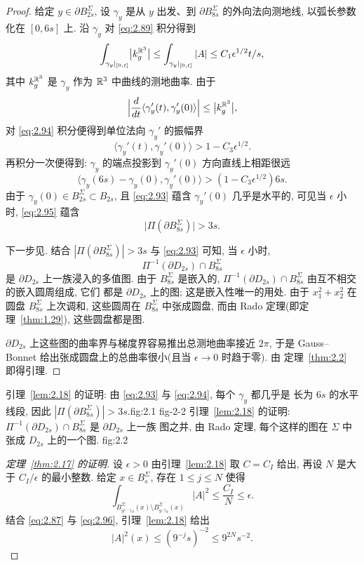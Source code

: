 \begin{proof}
给定 $y\in\partial B_{2s}^{\Sigma}$, 设 $\gamma_y$ 是从 $y$ 出发、到
$\partial B_{8s}^{\Sigma}$ 的外向法向测地线, 以弧长参数化在 $[0,6s]$ 上.
沿 $\gamma_y$ 对 \eqref{eq:2.89} 积分得到
\begin{equation}
\int_{\gamma_y|_{[0,t]}}\bigl|k_g^{\mathbb{R}^3}\bigr|
 \leq\int_{\gamma_y|_{[0,t]}}|A|
 \leq C_1\epsilon^{1/2}t/s,
\label{eq:2.94}
\end{equation}
其中 $k_g^{\mathbb{R}^3}$ 是 $\gamma_y$ 作为 $\mathbb{R}^3$ 中曲线的测地曲率. 由于
\[
\Bigl|\frac{d}{dt}\langle\gamma_y'(t),\gamma_y'(0)\rangle\Bigr|
 \leq\bigl|k_g^{\mathbb{R}^3}\bigr|,
\]
对 \eqref{eq:2.94} 积分便得到单位法向 $\gamma_y'$ 的振幅界
\[
\langle\gamma_y'(t),\gamma_y'(0)\rangle>1-C_3\epsilon^{1/2}.
\]
再积分一次便得到: $\gamma_y$ 的端点投影到 $\gamma_y'(0)$ 方向直线上相距很远
\begin{equation}
\langle\gamma_y(6s)-\gamma_y(0),\gamma_y'(0)\rangle
 >(1-C_3\epsilon^{1/2})6s.
\label{eq:2.95}
\end{equation}
由于 $\gamma_y(0)\in B_{2s}^{\Sigma}\subset B_{2s}$, 且 \eqref{eq:2.93} 蕴含
$\gamma_y'(0)$ 几乎是水平的, 可见当 $\epsilon$ 小时, \eqref{eq:2.95} 蕴含
\[
\bigl|\Pi(\partial B_{8s}^{\Sigma})\bigr|>3s.
\]

下一步见. 结合 $|\Pi(\partial B_{8s}^{\Sigma})|>3s$ 与
\eqref{eq:2.93} 可知, 当 $\epsilon$ 小时,
\[
\Pi^{-1}(\partial D_{2s})\cap B_{8s}^{\Sigma}
\]
是 $\partial D_{2s}$ 上一族浸入的多值图. 由于 $B_{8s}^{\Sigma}$ 是嵌入的,
$\Pi^{-1}(\partial D_{2s})\cap B_{8s}^{\Sigma}$ 由互不相交的嵌入圆周组成, 它们
都是 $\partial D_{2s}$ 上的图; 这是嵌入性唯一的用处. 由于 $x_1^{2}+x_2^{2}$ 在
圆盘 $B_{8s}^{\Sigma}$ 上次调和, 这些圆周在 $B_{8s}^{\Sigma}$ 中张成圆盘, 而由
Rado 定理(即定理~\ref{thm:1.29}), 这些圆盘都是图.

$\partial D_{2s}$ 上这些图的曲率界与梯度界容易推出总测地曲率接近 $2\pi$, 于是
Gauss--Bonnet 给出张成圆盘上的总曲率很小(且当 $\epsilon\to0$ 时趋于零). 由
定理~\ref{thm:2.2} 即得引理.
\end{proof}

 {引理~\ref{lem:2.18} 的证明: 由 \eqref{eq:2.93} 与 \eqref{eq:2.94}, 每个 $\gamma_y$ 都几乎是
  长为 $6s$ 的水平线段, 因此
  $|\Pi(\partial B_{8s}^{\Sigma})|>3s$.}{fig:2.1}
 {fig-2-2}
 {引理~\ref{lem:2.18} 的证明:
  $\Pi^{-1}(\partial D_{2s})\cap B_{8s}^{\Sigma}$ 是 $\partial D_{2s}$ 上一族
  图之并, 由 Rado 定理, 每个这样的图在 $\Sigma$ 中张成 $D_{2s}$ 上的一个图.}
 {fig:2.2}

\begin{proof}[定理~\ref{thm:2.17} 的证明]
设 $\epsilon>0$ 由引理~\ref{lem:2.18} 取 $C=C_I$ 给出, 再设 $N$ 是大于
$C_I/\epsilon$ 的最小整数. 给定 $x\in B_s^{\Sigma}$, 存在 $1\leq j\leq N$ 使得
\begin{equation}
\int_{B_{9^{1-j}s}^{\Sigma}(x)\setminus B_{9^{-j}s}^{\Sigma}(x)}|A|^{2}
 \leq\frac{C_I}{N}\leq\epsilon.
\label{eq:2.96}
\end{equation}
结合 \eqref{eq:2.87} 与 \eqref{eq:2.96}, 引理~\ref{lem:2.18} 给出
\[
|A|^{2}(x)\leq(9^{-j}s)^{-2}\leq9^{2N}s^{-2}.
\]
\end{proof}

